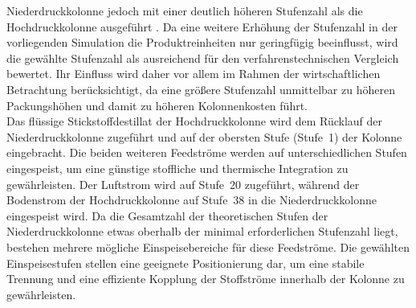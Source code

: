 Niederdruckkolonne jedoch mit einer deutlich höheren Stufenzahl als die Hochdruckkolonne ausgeführt
\cite{teschExergybasedMethodsApplied, cornelissenExergyAnalysisCryogenic1998}.
Da eine weitere Erhöhung der Stufenzahl in der vorliegenden Simulation die Produktreinheiten nur geringfügig beeinflusst, wird die gewählte Stufenzahl als ausreichend für den verfahrenstechnischen Vergleich bewertet. Ihr Einfluss wird
daher vor allem im Rahmen der wirtschaftlichen Betrachtung berücksichtigt, da eine größere Stufenzahl unmittelbar zu höheren Packungshöhen und damit zu höheren Kolonnenkosten führt.\\
Das flüssige Stickstoffdestillat der Hochdruckkolonne wird dem Rücklauf der Niederdruckkolonne zugeführt und auf der obersten Stufe (Stufe~1) der Kolonne eingebracht. Die beiden weiteren Feedströme werden auf unterschiedlichen Stufen eingespeist, um eine günstige stoffliche und thermische Integration zu gewährleisten. Der Luftstrom wird auf Stufe~20 zugeführt, während der Bodenstrom der Hochdruckkolonne auf Stufe~38 in die Niederdruckkolonne eingespeist wird. Da die Gesamtzahl der theoretischen Stufen der Niederdruckkolonne etwas oberhalb der minimal erforderlichen Stufenzahl liegt, bestehen mehrere mögliche Einspeisebereiche für diese Feedströme. Die gewählten Einspeisestufen stellen eine geeignete Positionierung dar, um eine stabile Trennung und eine effiziente Kopplung der Stoffströme innerhalb der Kolonne zu gewährleisten.\\

